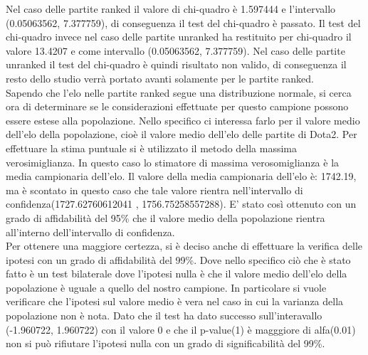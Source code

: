 Nel caso delle partite ranked il valore di chi-quadro è 1.597444 e l'intervallo (0.05063562, 7.377759), di conseguenza il test del chi-quadro è passato. Il test del chi-quadro invece nel caso delle partite unranked ha restituito per chi-quadro il valore 13.4207 e come intervallo (0.05063562, 7.377759). Nel caso delle partite unranked il test del chi-quadro è quindi risultato non valido, di conseguenza il resto dello studio verrà portato avanti solamente per le partite ranked. \\
Sapendo che l'elo nelle partite ranked segue una distribuzione normale, si cerca ora di determinare se le considerazioni effettuate per questo campione possono essere estese alla popolazione. Nello specifico ci interessa farlo per il valore medio dell'elo della popolazione, cioè il valore medio dell'elo delle partite di Dota2. Per effettuare la stima puntuale si è utilizzato il metodo della massima verosimiglianza. In questo caso lo stimatore di massima verosomiglianza è la media campionaria dell'elo. Il valore della media campionaria dell'elo è: 1742.19, ma è scontato in questo caso che tale valore rientra nell'intervallo di confidenza(1727.62760612041 ,  1756.75258557288). E' stato così ottenuto con un grado di affidabilità del 95\% che il valore medio della popolazione rientra all'interno dell'intervallo di confidenza. \\
Per ottenere una maggiore certezza, si è deciso anche di effettuare la verifica delle ipotesi con un grado di affidabilità del 99\%. Dove nello specifico ciò che è stato fatto è un test bilaterale dove l'ipotesi nulla è che il valore medio dell'elo della popolazione è uguale a quello del nostro campione. In particolare si vuole verificare che l'ipotesi sul valore medio è vera nel caso in cui la varianza della popolazione non è nota. Dato che il test ha dato successo sull'interavallo (-1.960722, 1.960722) con il valore 0 e che il p-value(1) è magggiore di alfa(0.01) non si può rifiutare l'ipotesi nulla con un grado di significabilità del 99\%. \\

